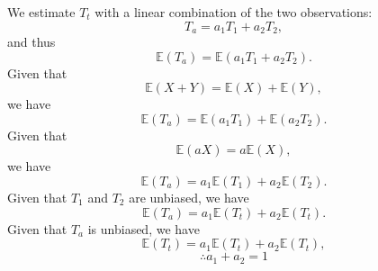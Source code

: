 We estimate $T_t$ with a linear combination of the two observations:
\begin{equation}
    T_a = a_1 T_1 + a_2 T_2,
\end{equation}
and thus
\begin{equation}
    \mathbb{E}(T_a) = \mathbb{E}(a_1 T_1 + a_2 T_2).
\end{equation}
Given that
\begin{equation}
    \mathbb{E}(X + Y) = \mathbb{E}(X) + \mathbb{E}(Y),
\end{equation}
we have
\begin{equation}
    \mathbb{E}(T_a) = \mathbb{E}(a_1 T_1) + \mathbb{E}(a_2 T_2).
\end{equation}
Given that
\begin{equation}
    \mathbb{E}(aX) = a \mathbb{E}(X),
\end{equation}
we have
\begin{equation}
    \mathbb{E}(T_a) = a_1 \mathbb{E}(T_1) + a_2 \mathbb{E}(T_2).
\end{equation}
Given that $T_1$ and $T_2$ are unbiased, we have
\begin{equation}
    \mathbb{E}(T_a) = a_1 \mathbb{E}(T_t) + a_2 \mathbb{E}(T_t).
\end{equation}
Given that $T_a$ is unbiased, we have
\begin{equation*}
    \mathbb{E}(T_t) = a_1 \mathbb{E}(T_t) + a_2 \mathbb{E}(T_t),
\end{equation*}
\begin{equation}
    \therefore a_1 + a_2 = 1
\end{equation}
